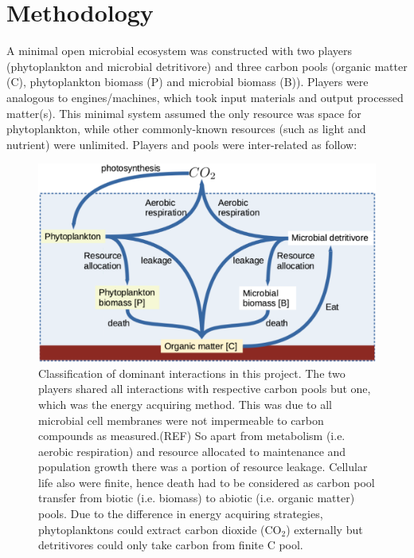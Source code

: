 \documentclass[../thesis.tex]{subfiles} %
\begin{document}
\section{Methodology}
A minimal open microbial ecosystem was constructed with two players (phytoplankton and microbial detritivore) and three carbon pools (organic matter (C), phytoplankton biomass (P) and microbial biomass (B)).  Players were analogous to engines/machines, which took input materials and output processed matter(s).  This minimal system assumed the only resource was space for phytoplankton, while other commonly-known resources (such as light and nutrient) were unlimited.  Players and pools were inter-related as follow:

\begin{figure}[H]
    \centering
    \includegraphics[width=\linewidth]{result/model.png}
    \caption{Classification of dominant interactions in this project.  The two players shared all interactions with respective carbon pools but one, which was the energy acquiring method.  This was due to all microbial cell membranes were not impermeable to carbon compounds as measured.(REF)  So apart from metabolism (i.e. aerobic respiration) and resource allocated to maintenance and population growth there was a portion of resource leakage.  Cellular life also were finite, hence death had to be considered as carbon pool transfer from biotic (i.e. biomass) to abiotic (i.e. organic matter) pools.  Due to the difference in energy acquiring strategies, phytoplanktons could extract carbon dioxide (CO$_2$) externally but detritivores could only take carbon from finite C pool.}
    \label{modelInWord}
\end{figure}
\end{document}
